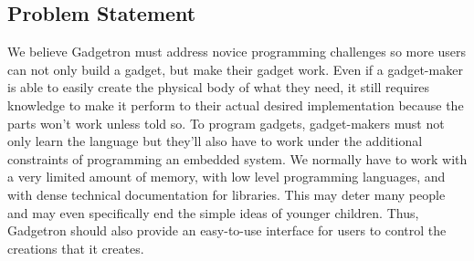 \documentclass[12pt]{article}
\begin{document}
\subsection{Problem Statement}
We believe Gadgetron must address novice programming challenges so more users can not only build a gadget, but make their gadget work. Even if a gadget-maker is able to easily create the physical body of what they need, it still requires knowledge to make it perform to their actual desired implementation because the parts won't work unless told so. To program gadgets, gadget-makers must not only learn the language but they'll also have to work under the additional constraints of programming an embedded system. We normally have to work with a very limited amount of memory, with low level programming languages, and with dense technical documentation for libraries. This may deter many people and may even specifically end the simple ideas of younger children. Thus, Gadgetron should also provide an easy-to-use interface for users to control the creations that it creates.
\end{document}
